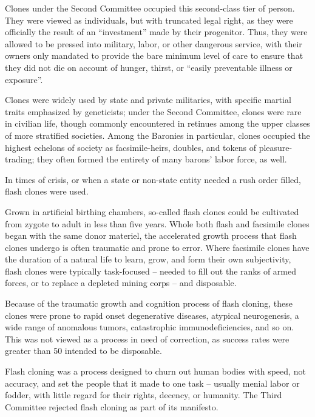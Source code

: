 Clones under the Second Committee occupied this second-class tier of person. They were
viewed as individuals, but with truncated legal right, as they were officially the result of an
“investment” made by their progenitor. Thus, they were allowed to be pressed into military, labor,
or other dangerous service, with their owners only mandated to provide the bare minimum level
of care to ensure that they did not die on account of hunger, thirst, or “easily preventable illness
or exposure”.





Clones were widely used by state and private militaries, with specific martial traits emphasized
by geneticists; under the Second Committee, clones were rare in civilian life, though commonly
encountered in retinues among the upper classes of more stratified societies. Among the
Baronies in particular, clones occupied the highest echelons of society as facsimile-heirs,
doubles, and tokens of pleasure-trading; they often formed the entirety of many barons’ labor
force, as well.


In times of crisis, or when a state or non-state entity needed a rush order filled, flash clones were
used.


Grown in artificial birthing chambers, so-called flash clones could be cultivated from zygote to
adult in less than five years. Whole both flash and facsimile clones began with the same donor
materiel, the accelerated growth process that flash clones undergo is often traumatic and prone
to error. Where facsimile clones have the duration of a natural life to learn, grow, and form their
own subjectivity, flash clones were typically task-focused -- needed to fill out the ranks of armed
forces, or to replace a depleted mining corps -- and disposable.


Because of the traumatic growth and cognition process of flash cloning, these clones were prone
to rapid onset degenerative diseases, atypical neurogenesis, a wide range of anomalous tumors,
catastrophic immunodeficiencies, and so on. This was not viewed as a process in need of
correction, as success rates were greater than 50%
intended to be disposable.


Flash cloning was a process designed to churn out human bodies with speed, not accuracy, and
set the people that it made to one task -- usually menial labor or fodder, with little regard for their
rights, decency, or humanity. The Third Committee rejected flash cloning as part of its manifesto.


